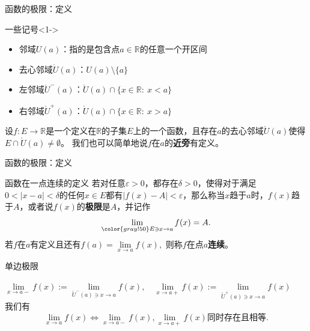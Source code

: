 \begin{frame}{函数的极限：定义}

\begin{block}{一些记号}<1->
\begin{itemize}
\item 邻域$U(a)$：指的是包含点$a\in\mathbb{R}$的任意一个开区间
\item 去心邻域$\mathring{U}(a)$：$U(a)\setminus \{a\}$
\item 左邻域$\mathring{U}^-(a)$：$\mathring{U}(a)\cap \{x\in\mathbb{R}: \ x < a\}$
\item 右邻域$\mathring{U}^+(a)$：$\mathring{U}(a)\cap \{x\in\mathbb{R}: \ x > a\}$
\end{itemize}
\end{block}

\pause

设$f:E\to\mathbb{R}$是一个定义在$\mathbb{R}$的子集$E$上的一个函数，且存在$a$的去心邻域$\mathring{U}(a)$使得$E\cap\mathring{U}(a)\neq\emptyset$。\newline
我们也可以简单地说$f$在$a$的{\bfseries 近旁}有定义。

\end{frame}


\begin{frame}{函数的极限：定义}

\begin{block}{函数在一点连续的定义}
若对任意$\varepsilon > 0$，都存在$\delta > 0$，使得对于满足$0 < |x-a| < \delta$的任何$x\in E$都有$|f(x)-A| < \varepsilon$，那么称当$x$趋于$a$时，$f(x)$趋于$A$，或者说$f(x)$的{\bfseries 极限}是$A$，并记作
$$\lim\limits_{{\color{gray!50} E\ni}x\to a}f(x) = A.$$
若$f$在$a$有定义且还有$f(a) = \lim\limits_{x\to a}f(x),$ 则称$f$在点$a${\bfseries 连续}。
\end{block}

\pause

\begin{block}{单边极限}
\begin{center}
\(\displaystyle \lim\limits_{x\to a-}f(x) := \lim\limits_{\mathring{U}^-(a) \ni x\to a}f(x), \quad \lim\limits_{x\to a+}f(x) := \lim\limits_{\mathring{U}^+(a) \ni x\to a}f(x)\) \\
\pause
我们有
$$\lim\limits_{x\to a}f(x) \Longleftrightarrow \lim\limits_{x\to a-}f(x),\lim\limits_{x\to a+}f(x) \text{同时存在且相等}.$$
\end{center}
\end{block}

\end{frame}

